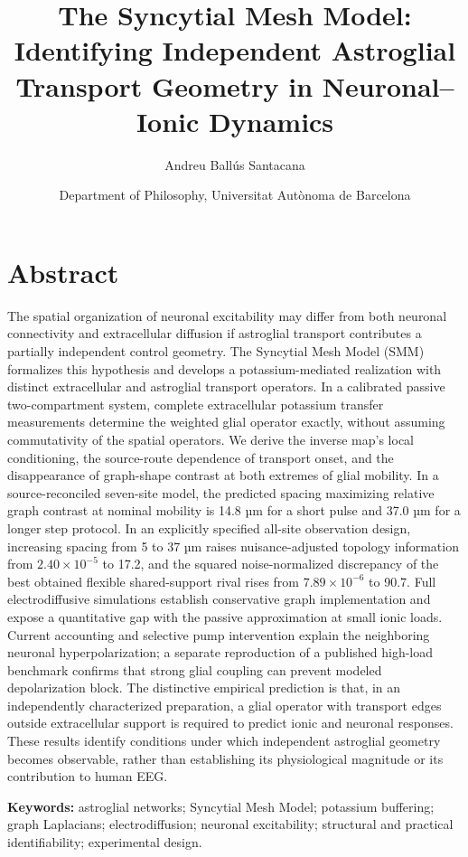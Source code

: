 \documentclass[
  11pt,
]{article}
\title{The Syncytial Mesh Model: Identifying Independent Astroglial
Transport Geometry in Neuronal--Ionic Dynamics}
\author{Andreu Ballús Santacana}
\date{Department of Philosophy, Universitat Autònoma de Barcelona}
\begin{document}
\maketitle

\section*{Abstract}\label{abstract}

The spatial organization of neuronal excitability may differ from both
neuronal connectivity and extracellular diffusion if astroglial
transport contributes a partially independent control geometry. The
Syncytial Mesh Model (SMM) formalizes this hypothesis and develops a
potassium-mediated realization with distinct extracellular and
astroglial transport operators. In a calibrated passive two-compartment
system, complete extracellular potassium transfer measurements determine
the weighted glial operator exactly, without assuming commutativity of
the spatial operators. We derive the inverse map's local conditioning,
the source-route dependence of transport onset, and the disappearance of
graph-shape contrast at both extremes of glial mobility. In a
source-reconciled seven-site model, the predicted spacing maximizing
relative graph contrast at nominal mobility is 14.8 µm for a short pulse
and 37.0 µm for a longer step protocol. In an explicitly specified
all-site observation design, increasing spacing from 5 to 37 µm raises
nuisance-adjusted topology information from \(2.40\times10^{-5}\) to
17.2, and the squared noise-normalized discrepancy of the best obtained
flexible shared-support rival rises from \(7.89\times10^{-6}\) to 90.7.
Full electrodiffusive simulations establish conservative graph
implementation and expose a quantitative gap with the passive
approximation at small ionic loads. Current accounting and selective
pump intervention explain the neighboring neuronal hyperpolarization; a
separate reproduction of a published high-load benchmark confirms that
strong glial coupling can prevent modeled depolarization block. The
distinctive empirical prediction is that, in an independently
characterized preparation, a glial operator with transport edges outside
extracellular support is required to predict ionic and neuronal
responses. These results identify conditions under which independent
astroglial geometry becomes observable, rather than establishing its
physiological magnitude or its contribution to human EEG.

\textbf{Keywords:} astroglial networks; Syncytial Mesh Model; potassium
buffering; graph Laplacians; electrodiffusion; neuronal excitability;
structural and practical identifiability; experimental design.
\end{document}
